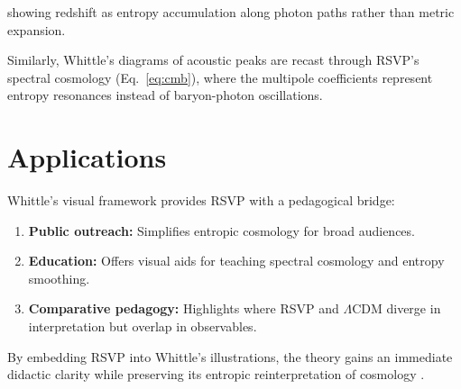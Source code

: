\documentclass[12pt]{report}
\begin{document}
showing redshift as entropy accumulation along photon paths rather than metric expansion.

Similarly, Whittle’s diagrams of acoustic peaks are recast through RSVP’s spectral cosmology (Eq.~\ref{eq:cmb}), where the multipole coefficients represent entropy resonances instead of baryon-photon oscillations.

\section{Applications}

Whittle’s visual framework provides RSVP with a pedagogical bridge:

\begin{enumerate}
    \item \textbf{Public outreach:} Simplifies entropic cosmology for broad audiences.  
    \item \textbf{Education:} Offers visual aids for teaching spectral cosmology and entropy smoothing.  
    \item \textbf{Comparative pedagogy:} Highlights where RSVP and $\Lambda$CDM diverge in interpretation but overlap in observables.  
\end{enumerate}

By embedding RSVP into Whittle’s illustrations, the theory gains an immediate didactic clarity while preserving its entropic reinterpretation of cosmology \citep{RSVPMeta2025}.




\end{document}
